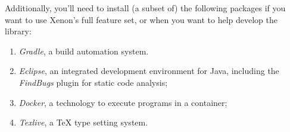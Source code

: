 
Additionally, you'll need to install (a subset of) the following packages if you want to use Xenon's full feature set, or when you want to help develop the library:
\begin{enumerate}
\item{\textit{Gradle}, a build automation system.}
\item{\textit{Eclipse}, an integrated development environment for Java, including the \textit{FindBugs} plugin for static code analysis;}
\item{\textit{Docker}, a technology to execute programs in a container;}
\item{\textit{Texlive}, a \TeX{} type setting system.}
\end{enumerate}
